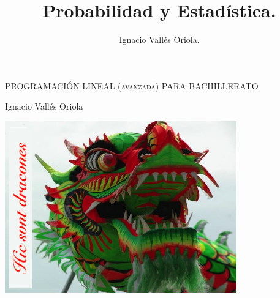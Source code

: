 \documentclass[a4paper, 12pt, spanish]{book}
\title{Probabilidad y Estadística.}
\author{Ignacio Vallés Oriola.}
\date{}
\numberwithin{equation}{chapter}
\numberwithin{teor}{chapter}
\numberwithin{coro}{chapter}
\numberwithin{prop}{chapter}
\numberwithin{defi}{chapter}
\numberwithin{axio}{chapter}
\numberwithin{ejem}{chapter}
\numberwithin{ejer}{chapter}
\numberwithin{ejre}{chapter}
\numberwithin{ayud}{chapter}
\numberwithin{solu}{chapter}
\numberwithin{prob}{chapter}
\begin{document}
\begin{titlepage}
	\centering
	\vspace*{\fill}
	{\scshape\LARGE PROGRAMACIÓN LINEAL (avanzada) PARA BACHILLERATO\par}
	\vspace{1cm}
	{\Large Ignacio Vallés Oriola \par}
	\vspace{3cm}
	\includegraphics[width=0.75\textwidth]{imagenes/hic-svnt-dracones}
	\vspace{3cm}
\end{titlepage}

\tableofcontents

%

%
%
%
%
%
%
%
%
%
%
%
		
\end{document}
